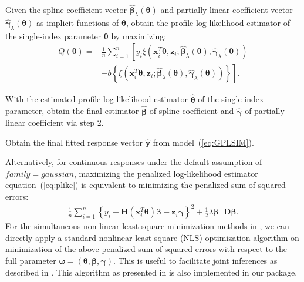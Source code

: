 \begin{algorithm}[H]
  Given the spline coefficient vector $\widehat{\boldsymbol{\beta}}_{\lambda}(\boldsymbol{\theta})$ and partially linear coefficient vector $\widehat{\boldsymbol{\gamma}}_{\lambda}(\boldsymbol{\theta})$ as implicit functions of
  ${\boldsymbol{\theta}}$, obtain the profile log-likelihood estimator of the single-index parameter $\boldsymbol{\theta}$ by maximizing:
  \begin{equation*}
  \begin{aligned}
    Q(\boldsymbol{\theta})=& \frac{1}{n} \sum_{i=1}^{n}\left[y_{i} \xi\left(\mathbf{x}^{T}_{i} \boldsymbol{\theta}, \mathbf{z}_{i} ; \widehat{\boldsymbol{\beta}}_{\lambda}(\boldsymbol{\theta}), \widehat{\boldsymbol{\gamma}}_{\lambda}(\boldsymbol{\theta})\right)\right.\\
    &\left.-b\left\{\xi\left(\mathbf{x}^{T}_{i} \boldsymbol{\theta}, \mathbf{z}_{i} ; \widehat{\boldsymbol{\beta}}_{\lambda}(\boldsymbol{\theta}), \widehat{\boldsymbol{\gamma}}_{\lambda}(\boldsymbol{\theta})\right)\right\}\right].
  \end{aligned}
  \end{equation*}

  With the estimated profile log-likelihood estimator $\widehat{\boldsymbol{\theta}}$ of the single-index parameter, obtain the final estimator $\widehat{\boldsymbol{\beta}}$ of spline coefficient and $\widehat{\boldsymbol{\gamma}}$ of partially linear coefficient via step 2.

  Obtain the final fitted response vector $\widehat{\mathbf{y}}$ from model~(\ref{eq:GPLSIM}). 

\end{algorithm}

Alternatively, for continuous responses under the default assumption of $family=gaussian$, maximizing the penalized log-likelihood estimator equation~(\ref{eq:plike}) is equivalent to minimizing the penalized sum of squared errors:
\begin{equation*}\begin{aligned}
\frac{1}{n} \sum_{i=1}^{n}\left\{y_{i} - \mathbf{H}(\mathbf{x}^{T}_{i} \boldsymbol{\theta}) \boldsymbol{\beta} - \mathbf{z}_{i}\boldsymbol{\gamma}\right\}^{2} + \frac{1}{2} \lambda \boldsymbol{\beta}^{\top} \mathbf{D} \boldsymbol{\beta}.
\end{aligned}\end{equation*}
For the simultaneous non-linear least square minimization methods in \cite{yu_penalized_2002}, we can directly apply a standard nonlinear least square  (NLS) optimization algorithm on minimization of the above penalized sum of squared errors with respect to the full parameter $\boldsymbol{\omega}=\left(\boldsymbol{\theta}, \boldsymbol{\beta}, \boldsymbol{\gamma}\right)$. This is useful to facilitate joint inferences as described in \cite{yu_penalized_2002}. This algorithm as presented in \cite{yu_penalized_2002} is also implemented in our  package.

